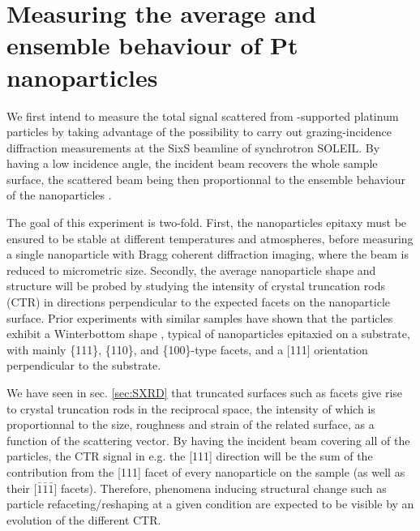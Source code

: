 \section{Measuring the average and ensemble behaviour of Pt nanoparticles}


We first intend to measure the total signal scattered from -supported platinum particles by taking advantage of the possibility to carry out grazing-incidence diffraction measurements at the SixS beamline of synchrotron SOLEIL.
By having a low incidence angle, the incident beam recovers the whole sample surface, the scattered beam being then proportionnal to the ensemble behaviour of the nanoparticles \parencite{Nolte2008, Hejral2013}.

The goal of this experiment is two-fold.
First, the nanoparticles epitaxy must be ensured to be stable at different temperatures and atmospheres, before measuring a single nanoparticle with Bragg coherent diffraction imaging, where the beam is reduced to micrometric size.
Secondly, the average nanoparticle shape and structure will be probed by studying the intensity of crystal truncation rods (CTR) in directions perpendicular to the expected facets on the nanoparticle surface.
Prior experiments with similar samples \parencite{Dupraz2017, Li2020, Lim2021, Dupraz2022} have shown that the particles exhibit a Winterbottom shape \parencite{WINTERBOTTOM1967, Boukouvala2021}, typical of nanoparticles epitaxied on a substrate, with mainly \{111\}, \{110\}, and \{100\}-type facets, and a [111] orientation perpendicular to the substrate.

We have seen in sec. \ref{sec:SXRD} that truncated surfaces such as facets give rise to crystal truncation rods in the reciprocal space, the intensity of which is proportionnal to the size, roughness and strain of the related surface, as a function of the scattering vector.
By having the incident beam covering all of the particles, the CTR signal in e.g. the [111] direction will be the sum of the contribution from the [111] facet of every nanoparticle on the sample (as well as their [$\bar{1}\bar{1}\bar{1}$] facets).
Therefore, phenomena inducing structural change such as particle refaceting/reshaping at a given condition are expected to be visible by an evolution of the different CTR.

